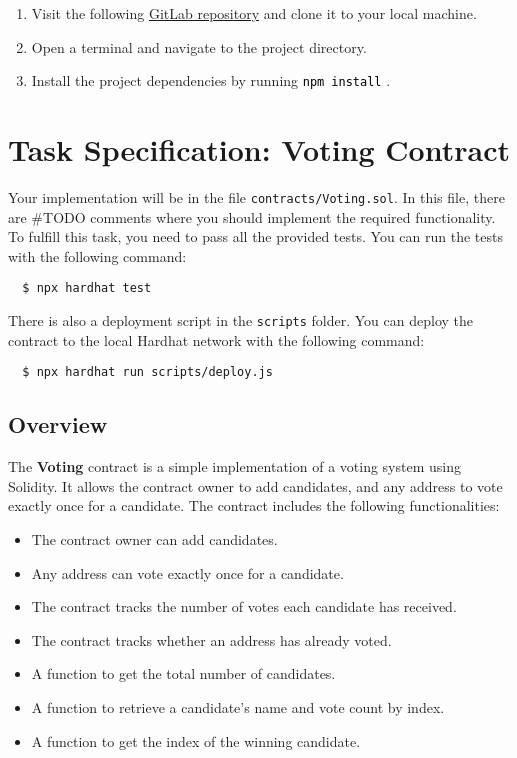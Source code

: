 \documentclass[12pt]{article}
\newcommand{\codegrey}[1]{%
  \texttt{\colorbox{black!4}{\textcolor{black}{#1}}}%
}
\begin{document}
\begin{enumerate}
    \item Visit the following \href{https://gitlab.fel.cvut.cz/radovluk/smart-contracts-exercises/-/tree/main/02-Decentralized-Voting-System/task/task-code?ref_type=heads}{GitLab repository} and clone it to your local machine.
    \item Open a terminal and navigate to the project directory.
    \item Install the project dependencies by running \codegrey{npm install}.
\end{enumerate}

\section{Task Specification: Voting Contract}

Your implementation will be in the file \texttt{contracts/Voting.sol}. In this file, there are \#TODO comments where you should implement the required functionality. To fulfill this task, you need to pass all the provided tests. You can run the tests with the following command:

\begin{verbatim}
  $ npx hardhat test
\end{verbatim}

There is also a deployment script in the \texttt{scripts} folder. You can deploy the contract to the local Hardhat network with the following command:
\begin{verbatim}
  $ npx hardhat run scripts/deploy.js
\end{verbatim}

\subsection{Overview}

The \textbf{Voting} contract is a simple implementation of a voting system using Solidity. It allows the contract owner to add candidates, and any address to vote exactly once for a candidate. The contract includes the following functionalities:
\begin{itemize}
    \item The contract owner can add candidates.
    \item Any address can vote exactly once for a candidate.
    \item The contract tracks the number of votes each candidate has received.
    \item The contract tracks whether an address has already voted.
    \item A function to get the total number of candidates.
    \item A function to retrieve a candidate's name and vote count by index.
    \item A function to get the index of the winning candidate.
\end{itemize}
\end{document}
